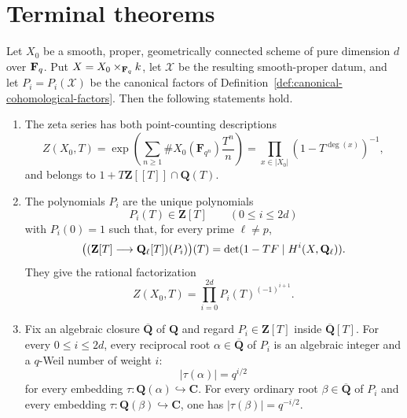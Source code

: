 

\section{Terminal theorems}

\begin{theorem}
\label{thm:weil-final}


Let \(X_0\) be a smooth, proper, geometrically connected scheme of pure
dimension \(d\) over \(\mathbf F_q\).  Put \(X=X_0\times_{\mathbf F_q}k\), let
\(\mathscr X\) be the resulting smooth-proper datum, and let
\(P_i=P_i(\mathscr X)\) be the canonical factors of
Definition~\ref{def:canonical-cohomological-factors}.  Then the following
statements hold.
\begin{enumerate}[label=\textup{(\roman*)}]
\item The zeta series has both point-counting descriptions
\[
 Z(X_0,T)=
 \exp\left(\sum_{n\geq1}
 \#X_0(\mathbf F_{q^n})\frac{T^n}{n}\right)
 =\prod_{x\in|X_0|}(1-T^{\deg(x)})^{-1},
\]
and belongs to \(1+T\mathbf Z[[T]]\cap\mathbf Q(T)\).

\item The polynomials \(P_i\) are the unique polynomials
\[
 P_i(T)\in\mathbf Z[T]
 \qquad(0\leq i\leq2d)
\]
with \(P_i(0)=1\) such that, for every prime \(\ell\neq p\),
\[
 \bigl((\mathbf Z[T]\longrightarrow\mathbf Q_{\ell}[T])(P_i)\bigr)(T)=
 \det(1-TF\mid H^i(X,\mathbf Q_{\ell})).
\]
They give the rational factorization
\[
 Z(X_0,T)=
 \prod_{i=0}^{2d}P_i(T)^{(-1)^{i+1}}.
\]

\item Fix an algebraic closure \(\overline{\mathbf Q}\) of \(\mathbf Q\)
and regard \(P_i\in\mathbf Z[T]\) inside
\(\overline{\mathbf Q}[T]\).  For every \(0\leq i\leq2d\), every
reciprocal root \(\alpha\in\overline{\mathbf Q}\) of \(P_i\) is an
algebraic integer
and a \(q\)-Weil number of weight \(i\):
\[
 |\tau(\alpha)|=q^{i/2}
\]
for every embedding
\(\tau:\mathbf Q(\alpha)\hookrightarrow\mathbf C\).  For every ordinary
root \(\beta\in\overline{\mathbf Q}\) of \(P_i\) and every embedding
\(\tau:\mathbf Q(\beta)\hookrightarrow\mathbf C\), one has
\(|\tau(\beta)|=q^{-i/2}\).


\end{enumerate}
\end{theorem}
